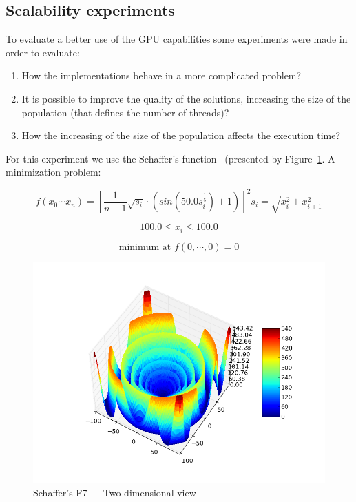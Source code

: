 \documentclass[conference]{IEEEtran}
\begin{document}
    \subsection{Scalability experiments}

    To evaluate a better use of the GPU capabilities some experiments were made in order to evaluate:
    \begin{enumerate}
        \item How the implementations behave in a more complicated problem?
        \item It is possible to improve the quality of the solutions, increasing the size of the population (that defines the number of threads)?
        \item How the increasing of the size of the population affects the execution time?
    \end{enumerate}

    For this experiment we use the Schaffer's function~\cite{Schaffer} (presented by Figure~\ref{fig:schaffer}.
    A minimization problem: 

    \begin{equation}
        f(x_0 \cdots x_n) = [\frac{1}{n-1}\sqrt{s_i} \cdot (sin(50.0s_i^{\frac{1}{5}})+1)]^2 s_i = \sqrt{x_i^2 + x_{i+1}^2}
    \end{equation}

    \begin{equation}
            100.0 \leq x_i \leq 100.0
    \end{equation}

    \begin{equation}
        \text{minimum at }f(0, \cdots, 0) = 0
    \end{equation}

     \begin{figure}[!htb]
        \centering
        \includegraphics[width=\columnwidth]{../img/schafferf7.png}
        \caption{Schaffer's F7 --- Two dimensional view}
        \label{fig:schaffer}
    \end{figure}
\end{document}
